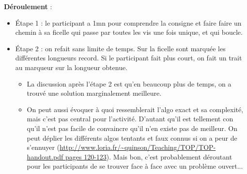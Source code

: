 \documentclass[a4paper]{article}
\newcommand{\titre}[1]{\medskip\noindent\textbf{#1} : }
\newcommand{\deroulement}{\titre{Déroulement}}
\begin{document}
\deroulement
\begin{itemize}
\item Étape 1 : le participant a 1mn pour comprendre la consigne et faire faire
un chemin à sa ficelle qui passe par toutes les vis une fois unique, et qui
boucle.
\item Étape 2 : on refait sans limite de temps. Sur la ficelle sont marquée les
différentes longueurs record. Si le participant fait plus court, on fait un
trait au marqueur sur la longueur obtenue.
\begin{itemize}
\item La discussion après l'étape 2 est qu'en beaucoup plus de temps, on a
trouvé une solution marginalement meilleure.
\item On peut aussi évoquer à quoi ressemblerait l'algo exact et sa complexité,
mais c'est pas central pour l'activité. D'autant qu'il est tellement con qu'il
n'est pas facile de convaincre qu'il n'en existe pas de meilleur. On peut
déplier les différents algos tentants et faux connus si on a peur de s'ennuyer
(\url{http://www.loria.fr/~quinson/Teaching/TOP/TOP-handout.pdf pages
120-123}). Mais bon, c'est probablement déroutant pour les participants de se
trouver face à face avec un problème ouvert...


\end{itemize}
\end{itemize}
\end{document}
